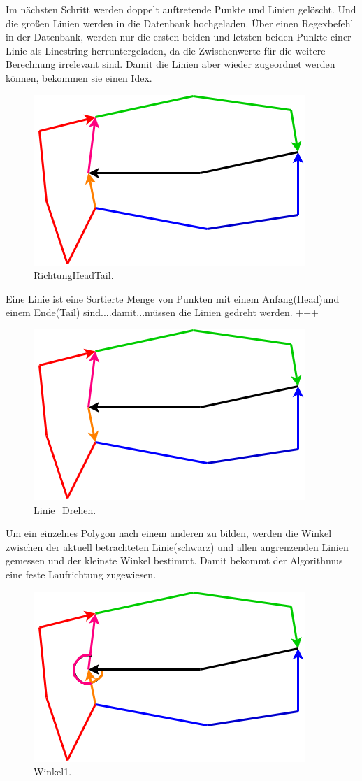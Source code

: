 \documentclass[a4paper, 12pt]{article}
\begin{document}
Im nächsten Schritt werden doppelt auftretende Punkte und Linien gelöscht. Und die großen Linien werden in die Datenbank hochgeladen. Über einen Regexbefehl in der Datenbank, werden nur die ersten beiden und letzten beiden Punkte einer Linie als Linestring herruntergeladen, da die Zwischenwerte für die weitere Berechnung irrelevant sind. Damit die Linien aber wieder zugeordnet werden können, bekommen sie einen Idex.
\begin{figure}[H]
  \includegraphics[scale=0.7]{Dokumentation/RichtungHeadTail.png}
  \caption{RichtungHeadTail.}
  \label{fig:RichtungHeadTail}
\end{figure}
Eine Linie ist eine Sortierte Menge von Punkten mit einem Anfang(Head)und einem Ende(Tail) sind....damit...müssen die Linien gedreht werden. +++
\begin{figure}[H]
  \includegraphics[scale=0.7]{Dokumentation/Linie_Drehen.png}
  \caption{Linie_Drehen.}
  \label{fig:Linie_Drehen}
\end{figure}
Um ein  einzelnes Polygon nach einem anderen zu bilden, werden die Winkel zwischen der aktuell betrachteten Linie(schwarz) und allen angrenzenden Linien gemessen und der kleinste Winkel bestimmt. Damit bekommt der Algorithmus eine feste Laufrichtung zugewiesen. 
\begin{figure}[H]
  \includegraphics[scale=0.7]{Dokumentation/1.png}
  \caption{Winkel1.}
  \label{fig:Winkel1}
\end{figure}
\end{document}
